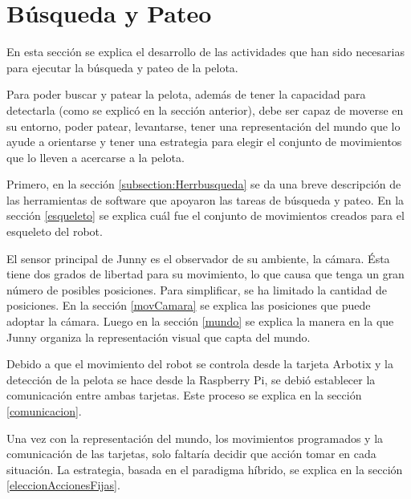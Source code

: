 \section{B\'usqueda y Pateo}\label{sec:busqueda}

En esta sección se explica el desarrollo de las actividades que han sido necesarias para ejecutar la búsqueda y pateo de la pelota.

Para poder buscar y patear la pelota, además de tener la capacidad para detectarla (como se explicó en la secci\'on anterior), debe ser capaz de moverse en su entorno, poder patear, levantarse, tener una representación del mundo que lo ayude a orientarse y tener una estrategia para elegir el conjunto de movimientos que lo lleven a acercarse a la pelota. 


Primero, en la sección \ref{subsection:Herrbusqueda} se da una breve descripción de las herramientas de software que apoyaron las tareas de búsqueda y pateo. En la sección \ref{esqueleto} se explica cuál fue el conjunto de movimientos creados para el esqueleto del robot.

El sensor principal de Junny es el observador de su ambiente, la c\'amara. \'Esta tiene dos grados de libertad para su movimiento, lo que causa que tenga un gran número de posibles posiciones. Para simplificar, se ha limitado la cantidad de posiciones. En la secci\'on \ref{movCamara} se explica las posiciones que puede adoptar la cámara. Luego en la secci\'on \ref{mundo} se explica la manera en la que Junny organiza la representaci\'on visual que capta del mundo.

Debido a que el movimiento del robot se controla desde la tarjeta Arbotix y la detecci\'on de la pelota se hace desde la Raspberry Pi, se debi\'o establecer la comunicaci\'on entre ambas tarjetas. Este proceso se explica en la secci\'on \ref{comunicacion}.

Una vez con la representaci\'on del mundo, los movimientos programados y la comunicaci\'on de las tarjetas, solo faltaría decidir que acci\'on tomar en cada situación. La estrategia, basada en el paradigma h\'ibrido, se explica en la secci\'on \ref{eleccionAccionesFijas}.        

 
